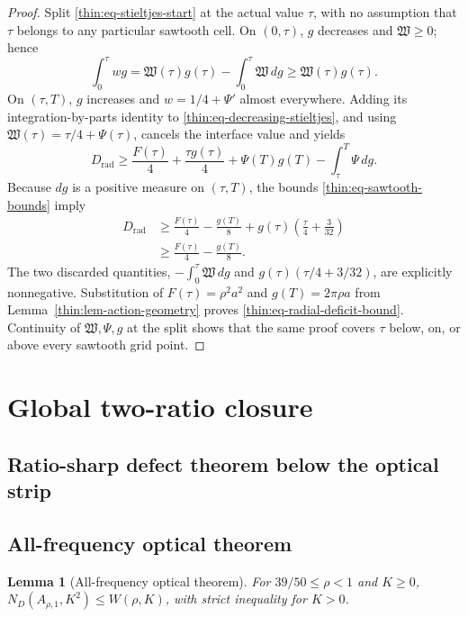 \documentclass[11pt]{article}
\numberwithin{equation}{section}
\newtheorem{lemma}[theorem]{Lemma}
\theoremstyle{definition}
\theoremstyle{remark}
\begin{document}
\begin{proof}
Split \eqref{thin:eq-stieltjes-start} at the actual value \(\tau\), with
no assumption that \(\tau\) belongs to any particular sawtooth cell.  On
\((0,\tau)\), \(g\) decreases and \(\mathfrak W\geq0\); hence
\begin{equation}
  \int_0^\tau wg
  =\mathfrak W(\tau)g(\tau)-\int_0^\tau \mathfrak W\,dg
  \geq \mathfrak W(\tau)g(\tau).
  \label{thin:eq-decreasing-stieltjes}
\end{equation}
On \((\tau,T)\), \(g\) increases and \(w=1/4+\Psi'\) almost everywhere.
Adding its integration-by-parts identity to
\eqref{thin:eq-decreasing-stieltjes}, and using
\(\mathfrak W(\tau)=\tau/4+\Psi(\tau)\), cancels the interface value and
yields
\[
  D_{\mathrm{rad}}
  \geq \frac{F(\tau)}4+\frac{\tau g(\tau)}4
     +\Psi(T)g(T)-\int_\tau^T\Psi\,dg.
\]
Because \(dg\) is a positive measure on \((\tau,T)\), the bounds
\eqref{thin:eq-sawtooth-bounds} imply
\[
\begin{aligned}
  D_{\mathrm{rad}}
  &\geq \frac{F(\tau)}4-\frac{g(T)}8
    +g(\tau)\left(\frac\tau4+\frac3{32}\right) \\
  &\geq \frac{F(\tau)}4-\frac{g(T)}8.
\end{aligned}
\]
The two discarded quantities,
\(-\int_0^\tau \mathfrak W\,dg\) and
\(g(\tau)(\tau/4+3/32)\), are explicitly nonnegative.  Substitution of
\(F(\tau)=\rho^2a^2\) and \(g(T)=2\pi\rho a\) from
Lemma~\ref{thin:lem-action-geometry} proves
\eqref{thin:eq-radial-deficit-bound}.  Continuity of
\(\mathfrak W,\Psi,g\) at the
split shows that the same proof covers \(\tau\) below, on, or above every
sawtooth grid point.
\end{proof}


\section{Global two-ratio closure}
\label{sec:global-two-owner}

\subsection{Ratio-sharp defect theorem below the optical strip}



\subsection{All-frequency optical theorem}

\begin{lemma}[All-frequency optical theorem]
\label{cm:lem-optical}
For \(39/50\leq\rho<1\) and \(K\geq0\),
\(N_D(A_{\rho,1},K^2)\leq W(\rho,K)\), with strict inequality for
\(K>0\).
\end{lemma}
\end{document}
